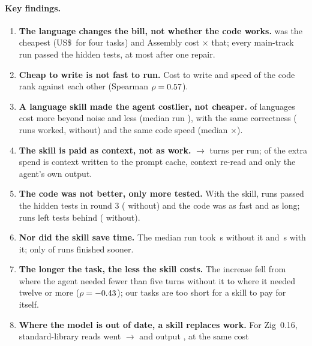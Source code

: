 \documentclass[11pt,a4paper]{article}
\begin{document}
\paragraph{Key findings.}
\begin{enumerate}[leftmargin=1.4em]
  \item \textbf{The language changes the bill, not whether the code works.} \CheapestLang{} was the
        cheapest (US\$\,\CostCheapest{} for four tasks) and Assembly cost \RatioAsm$\times$ that; every
        main-track run passed the hidden tests, at most after one repair.
  \item \textbf{Cheap to write is not fast to run.} Cost to write and speed of the code rank against
        each other (Spearman $\rho = 0.57$).
  \item \textbf{A language skill made the agent costlier, not cheaper.} \NSkillCostlier{} of
        \NSkillLangs{} languages cost more beyond noise and \NSkillCheaper{} less (median run
        \SkillRunCostPct), with the same correctness (\SkillWorksArm{} runs worked, \SkillWorksBase{}
        without) and the same code speed (median \SkillSpeedMedian$\times$).
  \item \textbf{The skill is paid as context, not as work.} \SkillTurnsBase{}$\to$\SkillTurnsArm{} turns
        per run; \SkillShareWrite{} of the extra spend is context written to the prompt cache, \SkillShareRead{}
        context re-read and only \SkillShareOutput{} the agent's own output.
  \item \textbf{The code was not better, only more tested.} With the skill, \SkillCodeSolvedArm{} runs
        passed the hidden tests in round 3 (\SkillCodeSolvedBase{} without) and the code was as fast and as
        long; \SkillCodeTestsArm{} runs left tests behind (\SkillCodeTestsBase{} without).
  \item \textbf{Nor did the skill save time.} The median run took \SkillTimeBase\,s without it and
        \SkillTimeArm\,s with it; only \NSkillFaster{} of \NSkillPairs{} runs finished sooner.
  \item \textbf{The longer the task, the less the skill costs.} The increase fell from \SkillLenShort{}
        where the agent needed fewer than five turns without it to \SkillLenLong{} where it needed twelve
        or more ($\rho = -0.43$); our tasks are too short for a skill to pay for itself.
  \item \textbf{Where the model is out of date, a skill replaces work.} For Zig~0.16, standard-library
        reads went \ZigStdBase{}$\to$\ZigStdArm{} and output \ZigOutPct, at the same cost

\end{enumerate}
\end{document}
